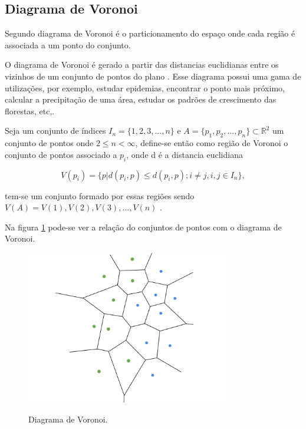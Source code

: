 \subsection{Diagrama de Voronoi}

Segundo  diagrama de Voronoi é o particionamento do espaço onde cada região é associada a um ponto do conjunto.

O diagrama de Voronoi é gerado a partir das distancias euclidianas entre os vizinhos de um conjunto de pontos do plano\space
\cite{diagrama_de_voronoi:_uma_exploracao_nas_distancias_euclidiana_e_do_taxi}. Esse diagrama possui uma gama de utilizações, por exemplo, estudar epidemias, encontrar o 
ponto mais próximo, calcular a precipitação de uma área, estudar os padrões de crescimento das florestas, etc,\space\cite{poligonos_de_thiessen_ou_voronoi}. 

Seja um conjunto de índices $I_n = \{1, 2, 3, ..., n\}$ e $A = \{p_1, p_2, ..., p_n\} \subset \mathbb{R}^2$ um conjunto de pontos onde $2 \leq n < \infty$, define-se então como região de Voronoi o conjunto de pontos associado a $p_i$, onde d é a distancia euclidiana

\begin{equation}
	V(p_i) = \{p|d(p_i,p) \leq d(p_i,p);i \neq j, i, j \in I_n\},
\end{equation}


tem-se um conjunto formado por essas regiões sendo $V(A) = {V(1), V(2), V(3), ..., V(n)}$ \cite{rodrigues_diagrama_2019}.

Na figura \cref{fig:diagrama_voronoi} pode-se ver a relação do conjuntos de pontos com o diagrama de Voronoi.

\begin{figure}[H]
	\centering
	\caption{Diagrama de Voronoi.}
	\includegraphics[width=0.8\textwidth]{figures/diagrama_de_voronoi.png}
	\label{fig:diagrama_voronoi}
\end{figure}
